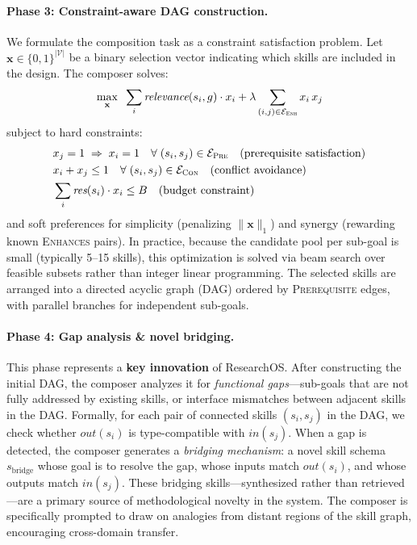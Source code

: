 \paragraph{Phase 3: Constraint-aware DAG construction.}
We formulate the composition task as a constraint satisfaction problem. Let $\mathbf{x} \in \{0,1\}^{|\mathcal{V}|}$ be a binary selection vector indicating which skills are included in the design. The composer solves:
\begin{equation}
\label{eq:csp}
\max_{\mathbf{x}} \;\; \sum_{i} \textit{relevance}(s_i, g) \cdot x_i + \lambda \sum_{(i,j) \in \mathcal{E}_{\textsc{Enh}}} x_i \, x_j
\end{equation}
subject to hard constraints:
\begin{align}
\label{eq:constraints}
& x_j = 1 \;\Rightarrow\; x_i = 1 \quad \forall\; (s_i, s_j) \in \mathcal{E}_{\textsc{Pre}} \quad \text{(prerequisite satisfaction)} \\
& x_i + x_j \leq 1 \quad \forall\; (s_i, s_j) \in \mathcal{E}_{\textsc{Con}} \quad \text{(conflict avoidance)} \\
& \sum_{i} \textit{res}(s_i) \cdot x_i \leq B \quad \text{(budget constraint)}
\end{align}
and soft preferences for simplicity (penalizing $\|\mathbf{x}\|_1$) and synergy (rewarding known \textsc{Enhances} pairs). In practice, because the candidate pool per sub-goal is small (typically 5--15 skills), this optimization is solved via beam search over feasible subsets rather than integer linear programming. The selected skills are arranged into a directed acyclic graph (DAG) ordered by \textsc{Prerequisite} edges, with parallel branches for independent sub-goals.

\paragraph{Phase 4: Gap analysis \& novel bridging.}
This phase represents a \textbf{key innovation} of ResearchOS. After constructing the initial DAG, the composer analyzes it for \emph{functional gaps}---sub-goals that are not fully addressed by existing skills, or interface mismatches between adjacent skills in the DAG. Formally, for each pair of connected skills $(s_i, s_j)$ in the DAG, we check whether $\textit{out}(s_i)$ is type-compatible with $\textit{in}(s_j)$. When a gap is detected, the composer generates a \emph{bridging mechanism}: a novel skill schema $s_{\text{bridge}}$ whose goal is to resolve the gap, whose inputs match $\textit{out}(s_i)$, and whose outputs match $\textit{in}(s_j)$. These bridging skills---synthesized rather than retrieved---are a primary source of methodological novelty in the system. The composer is specifically prompted to draw on analogies from distant regions of the skill graph, encouraging cross-domain transfer.

